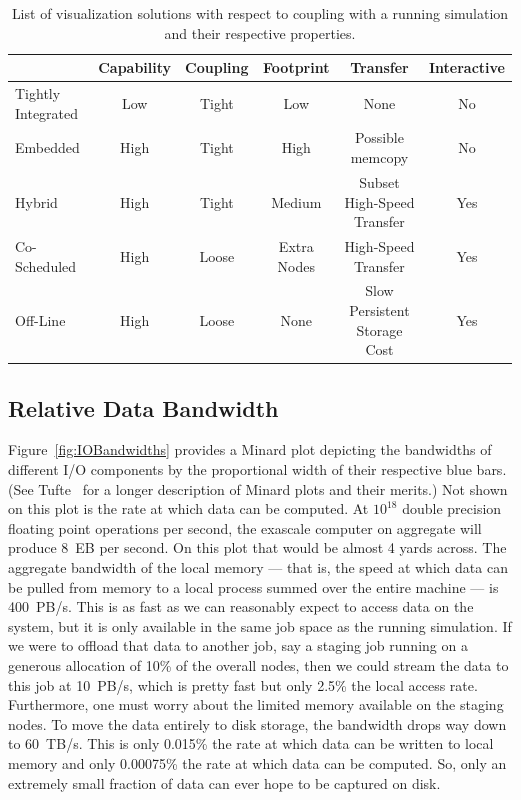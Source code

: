 \documentclass[conference]{IEEEtran}
\newcommand*{\scite}[1]{~\cite{#1}}
\begin{document}
\begin{table}
  \centering
  \caption{List of visualization solutions with respect to coupling with a
    running simulation and their respective properties.}
  \label{table:InSituSolutions}
  \begin{tabular}{@{}lccccc@{}}
    \toprule
    & Capability & Coupling & Footprint & Transfer & Interactive \\
    \midrule
    Tightly Integrated & Low & Tight & \textcolor{goodcolor}{Low} & \textcolor{goodcolor}{None} & No \\
    Embedded & \textcolor{goodcolor}{High} & Tight & High & Possible memcopy & No \\
    Hybrid & \textcolor{goodcolor}{High} & Tight & Medium & Subset High-Speed Transfer & \textcolor{goodcolor}{Yes} \\
    Co-Scheduled & \textcolor{goodcolor}{High} & \textcolor{goodcolor}{Loose} & Extra Nodes & High-Speed Transfer & \textcolor{goodcolor}{Yes} \\
    Off-Line & \textcolor{goodcolor}{High} & \textcolor{goodcolor}{Loose} & \textcolor{goodcolor}{None} & \textcolor{badcolor}{Slow Persistent Storage Cost} & \textcolor{goodcolor}{Yes} \\
    \bottomrule
  \end{tabular}
\end{table}

\subsection{Relative Data Bandwidth}

\noindent
Figure~\ref{fig:IOBandwidths} provides a Minard plot depicting the
bandwidths of different I/O components by the proportional width of their
respective blue bars.  (See Tufte\scite{Tufte2001} for a longer description
of Minard plots and their merits.)  Not shown on this plot is the rate at
which data can be computed.  At $10^{18}$ double precision floating point
operations per second, the exascale computer on aggregate will produce 8~EB
per second.  On this plot that would be almost 4 yards across.  The
aggregate bandwidth of the local memory --- that is, the speed at which
data can be pulled from memory to a local process summed over the entire
machine --- is 400~PB/s.  This is as fast as we can reasonably expect to
access data on the system, but it is only available in the same job space
as the running simulation.  If we were to offload that data to another job,
say a staging job running on a generous allocation of 10\% of the overall
nodes, then we could stream the data to this job at 10~PB/s, which is
pretty fast but only 2.5\% the local access rate.  Furthermore, one must
worry about the limited memory available on the staging nodes.  To move the
data entirely to disk storage, the bandwidth drops way down to 60~TB/s.
This is only 0.015\% the rate at which data can be written to local memory
and only 0.00075\% the rate at which data can be computed.  So, only an
extremely small fraction of data can ever hope to be captured on disk.
\end{document}

